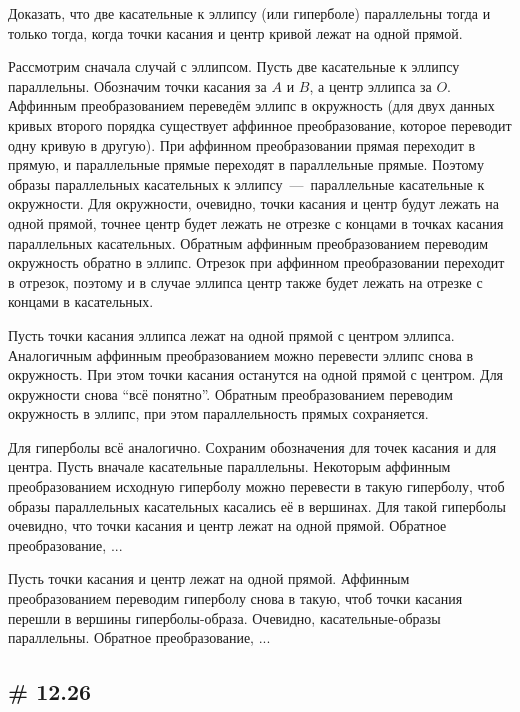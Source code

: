 \documentclass[a4paper,12pt]{article}
\begin{document}
  Доказать, что две касательные к эллипсу (или гиперболе) параллельны тогда и только тогда, когда точки касания и центр кривой лежат на одной прямой.
  
  \begin{solution}
    Рассмотрим сначала случай с эллипсом.
    Пусть две касательные к эллипсу параллельны.
    Обозначим точки касания за $A$ и $B$, а центр эллипса за $O$.
    Аффинным преобразованием переведём эллипс в окружность (для двух данных кривых второго порядка существует аффинное преобразование, которое переводит одну кривую в другую).
    При аффинном преобразовании прямая переходит в прямую, и параллельные прямые переходят в параллельные прямые.
    Поэтому образы параллельных касательных к эллипсу~---~параллельные касательные к окружности.
    Для окружности, очевидно, точки касания и центр будут лежать на одной прямой, точнее центр будет лежать не отрезке с концами в точках касания параллельных касательных.
    Обратным аффинным преобразованием переводим окружность обратно в эллипс.
    Отрезок при аффинном преобразовании переходит в отрезок, поэтому и в случае эллипса центр также будет лежать на отрезке с концами в касательных.
    
    Пусть точки касания эллипса лежат на одной прямой с центром эллипса.
    Аналогичным аффинным преобразованием можно перевести эллипс снова в окружность.
    При этом точки касания останутся на одной прямой с центром.
    Для окружности снова ``всё понятно''.
    Обратным преобразованием переводим окружность в эллипс, при этом параллельность прямых сохраняется.
    
    \bigskip
    
    Для гиперболы всё аналогично.
    Сохраним обозначения для точек касания и для центра.
    Пусть вначале касательные параллельны.
    Некоторым аффинным преобразованием исходную гиперболу можно перевести в такую гиперболу, чтоб образы параллельных касательных касались её в вершинах.  %
    Для такой гиперболы очевидно, что точки касания и центр лежат на одной прямой.
    Обратное преобразование, ...
    
    Пусть точки касания и центр лежат на одной прямой.
    Аффинным преобразованием переводим гиперболу снова в такую, чтоб точки касания перешли в вершины гиперболы-образа.
    Очевидно, касательные-образы параллельны.
    Обратное преобразование, ...
  \end{solution}
  
  
  \subsection{\# 12.26}
  
\end{document}
